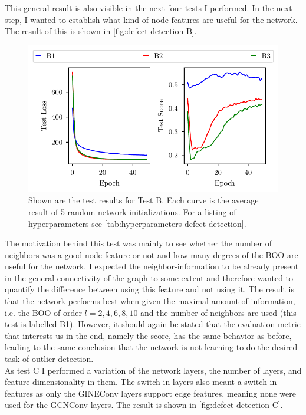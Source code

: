 \documentclass[11pt,a4paper]{article}
\begin{document}
This general result is also visible in the next four tests I performed. 
In the next step, I wanted to establish what kind of node features are useful for the network. 
The result of this is shown in \autoref{fig:defect detection B}. 
\begin{figure}[htbp]
\centering
\includegraphics{images/plots/defect_detection_B.pdf}
\caption{Shown are the test results for Test B. Each curve is the average result of 5 random network initializations. For a listing of hyperparameters see \autoref{tab:hyperparameters defect detection}.}
\label{fig:defect detection B}
\end{figure}
The motivation behind this test was mainly to see whether the number of neighbors was a good node feature or not and how many degrees of the BOO are useful for the network. 
I expected the neighbor-information to be already present in the general connectivity of the graph to some extent and therefore wanted to quantify the difference between using this feature and not using it.  
The result is that the network performs best when given the maximal amount of information, i.e. the BOO of order $l=2,4,6,8,10$ and the number of neighbors are used (this test is labelled B1). 
However, it should again be stated that the evaluation metric that interests us in the end, namely the score, has the same behavior as before, leading to the same conclusion that the network is not learning to do the desired task of outlier detection. \\

As test C I performed a variation of the network layers, the number of layers, and feature dimensionality in them. 
The switch in layers also meant a switch in features as only the GINEConv layers support edge features, meaning none were used for the GCNConv layers. 
The result is shown in \autoref{fig:defect detection C}. 
\end{document}
